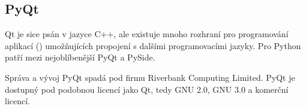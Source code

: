 \subsection{PyQt}
Qt je sice psán v jazyce C++, ale existuje mnoho rozhraní pro programování aplikací () umožňujících propojení s dalšími programovacími jazyky. Pro Python patří mezi nejoblíbenější PyQt a PySide.

Správa a vývoj PyQt spadá pod firmu Riverbank Computing Limited. PyQt je dostupný pod podobnou licencí jako Qt, tedy GNU  2.0, GNU  3.0 a komerční licencí.


